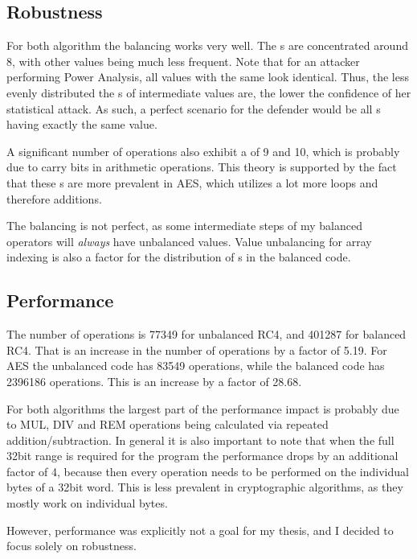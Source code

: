 \subsection{Robustness}
For both algorithm the balancing works very well.
The \hammingw{}s are concentrated around 8, with other values being much less frequent.
Note that for an attacker performing Power Analysis, all values with the same \hammingw{} look identical.
Thus, the less evenly distributed the \hammingw{}s of intermediate values are, the lower the confidence of her statistical attack.
As such, a perfect scenario for the defender would be all \hammingw{}s having exactly the same value.

A significant number of operations also exhibit a \hammingw{} of 9 and 10, which is probably due to carry bits in arithmetic operations.
This theory is supported by the fact that these \hammingw{}s are more prevalent in AES, which utilizes a lot more loops and therefore additions.

The balancing is not perfect, as some intermediate steps of my balanced operators will \emph{always} have unbalanced values.
Value unbalancing for array indexing is also a factor for the distribution of \hammingw{}s in the balanced code.

\subsection{Performance}
The number of operations is \num{77349} for unbalanced RC4, and \num{401287} for balanced RC4.
That is an increase in the number of operations by a factor of \num{5.19}.
For AES the unbalanced code has \num{83549} operations, while the balanced code has \num{2396186} operations.
This is an increase by a factor of \num{28.68}.

For both algorithms the largest part of the performance impact is probably due to MUL, DIV and REM operations being calculated via repeated addition/subtraction.
In general it is also important to note that when the full 32bit range is required for the program the performance drops by an additional factor of 4, because then every operation needs to be performed on the individual bytes of a 32bit word.
This is less prevalent in cryptographic algorithms, as they mostly work on individual bytes.

However, performance was explicitly not a goal for my thesis, and I decided to focus solely on robustness.
